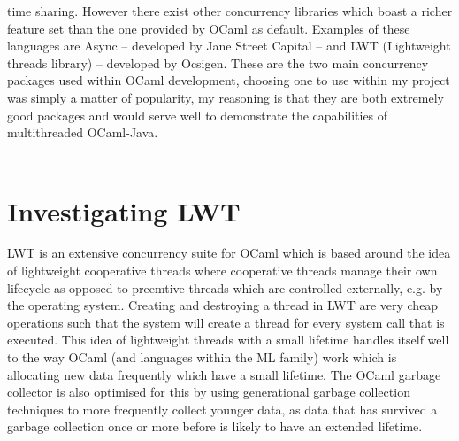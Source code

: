 \documentclass[12pt,twoside,notitlepage]{report}
\begin{document}
time sharing. However there exist other concurrency libraries which boast a richer feature set than the one provided by OCaml as default. Examples of these languages are Async -- developed by Jane Street Capital -- and LWT
(Lightweight threads library) -- developed by Ocsigen. These are the two main concurrency packages used within OCaml development, choosing one to use within my project was simply a matter of popularity, my reasoning
is that they are both extremely good packages and would serve well to demonstrate the capabilities of multithreaded OCaml-Java.
\\
\\
\section{Investigating LWT}
\label{sec:investigating_lwt}
%
%
LWT is an extensive concurrency suite for OCaml which is based around the idea of lightweight cooperative threads\cite{dimino2012} where cooperative threads manage their own lifecycle as opposed to preemtive threads which are
controlled externally, e.g. by the operating system. Creating and destroying a thread in LWT are very cheap operations such that the system will create a thread for every system call that is executed. This idea of lightweight threads
with a small lifetime handles itself well to the way OCaml (and languages within the ML family) work which is allocating new data frequently which have a small lifetime. The OCaml garbage collector is also optimised for this by using
generational garbage collection techniques to more frequently collect younger data, as data that has survived a garbage collection once or more before is likely to have an extended lifetime.\cite{chailloux2000}
\end{document}
